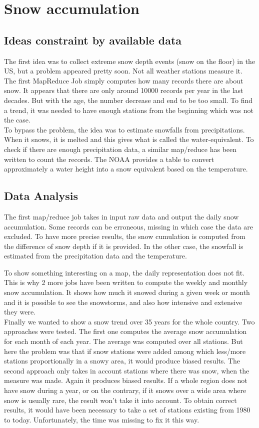 \section{Snow accumulation}

\subsection{Ideas constraint by available data}
The first idea was to collect extreme snow depth events (snow on the floor) in the US, but a problem appeared pretty soon. Not all weather stations measure it. The first MapReduce Job simply computes how many records there are about snow. It appears that there are only around 10000 records per year in the last decades. But with the age, the number decrease and end to be too small. To find a trend, it was needed to have enough stations from the beginning which was not the case.  \\

To bypass the problem, the idea was to estimate snowfalls from precipitations. When it snows, it is melted and this gives what is called the water-equivalent. To check if there are enough precipitation data, a similar map/reduce has been written to count the records. The NOAA provides a table to convert approximately a water height into a snow equivalent based on the temperature.

\subsection{Data Analysis}
The first map/reduce job takes in input raw data and output the daily snow accumulation. Some records can be erroneous, missing in which case the data are excluded. To have more precise results, the snow cumulation is computed from the difference of snow depth if it is provided. In the other case, the snowfall is estimated from the precipitation data and the temperature.

To show something interesting on a map, the daily representation does not fit. This is why 2 more jobs have been written to compute the weekly and monthly snow accumulation. It shows how much it snowed during a given week or month and it is possible to see the snowstorms, and also how intensive and extensive they were.\\


Finally we wanted to show a snow trend over 35 years for the whole country. Two approaches were tested. The first one computes the average snow accumulation for each month of each year. The average was computed over all stations. But here the problem was that if snow stations were added among which less/more stations proportionally in a snowy area, it would produce biased results. The second approach only takes in account stations where there was snow, when the measure was made. Again it produces biased results. If a whole region does not have snow during a year, or on the contrary, if it snows over a wide area  where snow is usually rare, the result won't take it into account. To obtain correct results, it would have been necessary to take a set of stations existing from 1980 to today. Unfortunately, the time was missing to fix it this way. 




